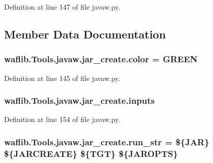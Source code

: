 Definition at line 147 of file javaw.\+py.



\subsection{Member Data Documentation}
\subsubsection[{\texorpdfstring{color}{color}}]{ waflib.\+Tools.\+javaw.\+jar\+\_\+create.\+color = \textquotesingle{}G\+R\+E\+EN\textquotesingle{}\hspace{0.3cm}{\ttfamily [static]}}\hypertarget{classwaflib_1_1_tools_1_1javaw_1_1jar__create_ab161819e56f907ad572510c6f2601e32}{}\label{classwaflib_1_1_tools_1_1javaw_1_1jar__create_ab161819e56f907ad572510c6f2601e32}


Definition at line 145 of file javaw.\+py.

\subsubsection[{\texorpdfstring{inputs}{inputs}}]{\setlength{\rightskip}{0pt plus 5cm}waflib.\+Tools.\+javaw.\+jar\+\_\+create.\+inputs}\hypertarget{classwaflib_1_1_tools_1_1javaw_1_1jar__create_a6c9c26c19e7e97ce1e051ded91d5a523}{}\label{classwaflib_1_1_tools_1_1javaw_1_1jar__create_a6c9c26c19e7e97ce1e051ded91d5a523}


Definition at line 154 of file javaw.\+py.

\subsubsection[{\texorpdfstring{run\+\_\+str}{run_str}}]{ waflib.\+Tools.\+javaw.\+jar\+\_\+create.\+run\+\_\+str = \textquotesingle{}\$\{J\+AR\} \$\{J\+A\+R\+C\+R\+E\+A\+TE\} \$\{T\+GT\} \$\{J\+A\+R\+O\+P\+TS\}\textquotesingle{}\hspace{0.3cm}{\ttfamily [static]}}\hypertarget{classwaflib_1_1_tools_1_1javaw_1_1jar__create_a97a452c9ca5feb461291f5de4818fae6}{}\label{classwaflib_1_1_tools_1_1javaw_1_1jar__create_a97a452c9ca5feb461291f5de4818fae6}


